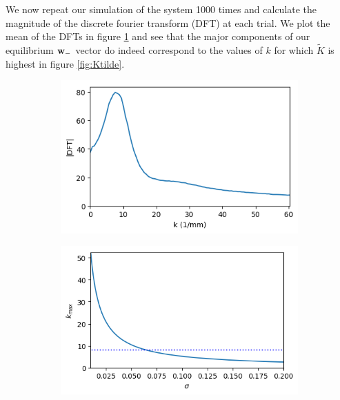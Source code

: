 \documentclass{article}
\begin{document}
We now repeat our simulation of the system 1000 times and calculate the magnitude of the discrete fourier transform (DFT) at each trial. We plot the mean of the DFTs in figure \ref{fig:DFT} and see that the major components of our equilibrium ${\bf w}_-$ vector do indeed correspond to the values of $k$ for which $\tilde K$ is highest in figure \ref{fig:Ktilde}. 

\begin{figure}[h]
	\centering
	\begin{subfigure}[t]{0.35\linewidth}
		\centering
		\includegraphics[width = 1.0\linewidth, trim={0 0 0 0}, clip=true]{figures/plot_DFT.png}
		\label{fig:DFT}	
	\end{subfigure}%
	\hspace{0.1\linewidth}
	\begin{subfigure}[t]{0.35\linewidth}
		\centering
		\includegraphics[width = 1.0\linewidth, trim={0 0 0 0}, clip=true]{figures/test_maxk.png}
		\label{fig:maxk}	
	\end{subfigure}%
\caption{}
\label{}
\end{figure}
\end{document}
